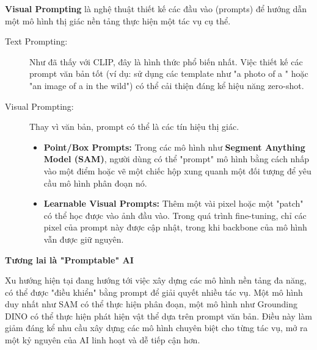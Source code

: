 \textbf{Visual Prompting} là nghệ thuật thiết kế các đầu vào (prompts) để hướng dẫn một mô hình thị giác nền tảng thực hiện một tác vụ cụ thể.
\begin{description}
	\item[Text Prompting:] Như đã thấy với CLIP, đây là hình thức phổ biến nhất. Việc thiết kế các prompt văn bản tốt (ví dụ: sử dụng các template như "a photo of a {}" hoặc "an image of a {} in the wild") có thể cải thiện đáng kể hiệu năng zero-shot.
	\item[Visual Prompting:] Thay vì văn bản, prompt có thể là các tín hiệu thị giác.
	\begin{itemize}
		\item \textbf{Point/Box Prompts:} Trong các mô hình như \textbf{Segment Anything Model (SAM)}, người dùng có thể "prompt" mô hình bằng cách nhấp vào một điểm hoặc vẽ một chiếc hộp xung quanh một đối tượng để yêu cầu mô hình phân đoạn nó.
		\item \textbf{Learnable Visual Prompts:} Thêm một vài pixel hoặc một "patch" có thể học được vào ảnh đầu vào. Trong quá trình fine-tuning, chỉ các pixel của prompt này được cập nhật, trong khi backbone của mô hình vẫn được giữ nguyên.
	\end{itemize}
\end{description}

\begin{mdframed}[style=infobox]
	\textbf{Tương lai là "Promptable" AI}
	
	Xu hướng hiện tại đang hướng tới việc xây dựng các mô hình nền tảng đa năng, có thể được "điều khiển" bằng prompt để giải quyết nhiều tác vụ. Một mô hình duy nhất như SAM có thể thực hiện phân đoạn, một mô hình như Grounding DINO có thể thực hiện phát hiện vật thể dựa trên prompt văn bản. Điều này làm giảm đáng kể nhu cầu xây dựng các mô hình chuyên biệt cho từng tác vụ, mở ra một kỷ nguyên của AI linh hoạt và dễ tiếp cận hơn.
\end{mdframed}

